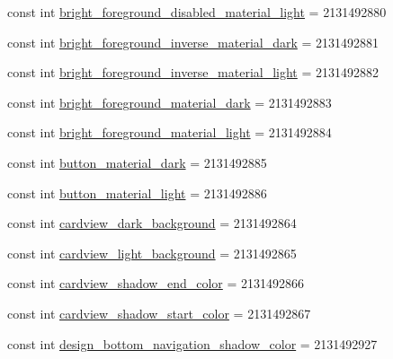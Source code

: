 \begin{DoxyCompactItemize}
const int \mbox{\hyperlink{class_f_w_p_s___app_1_1_droid_1_1_resource_1_1_color_aece9a2b0fe298f755847e43b8aae1e44}{bright\+\_\+foreground\+\_\+disabled\+\_\+material\+\_\+light}} = 2131492880
\item 
const int \mbox{\hyperlink{class_f_w_p_s___app_1_1_droid_1_1_resource_1_1_color_afa36b290d5382c4b94510a599b590055}{bright\+\_\+foreground\+\_\+inverse\+\_\+material\+\_\+dark}} = 2131492881
\item 
const int \mbox{\hyperlink{class_f_w_p_s___app_1_1_droid_1_1_resource_1_1_color_a1a5cf7a02bcf391cf2f2a0d705d61934}{bright\+\_\+foreground\+\_\+inverse\+\_\+material\+\_\+light}} = 2131492882
\item 
const int \mbox{\hyperlink{class_f_w_p_s___app_1_1_droid_1_1_resource_1_1_color_a499b6d22a3e6205b5ed151aaf6f10c6a}{bright\+\_\+foreground\+\_\+material\+\_\+dark}} = 2131492883
\item 
const int \mbox{\hyperlink{class_f_w_p_s___app_1_1_droid_1_1_resource_1_1_color_a9bea0472604f703ac8806c6e0479299a}{bright\+\_\+foreground\+\_\+material\+\_\+light}} = 2131492884
\item 
const int \mbox{\hyperlink{class_f_w_p_s___app_1_1_droid_1_1_resource_1_1_color_a103b7f43377e0103473a9e46514ba669}{button\+\_\+material\+\_\+dark}} = 2131492885
\item 
const int \mbox{\hyperlink{class_f_w_p_s___app_1_1_droid_1_1_resource_1_1_color_ab5d03e4a021259a2a97823e06f65083d}{button\+\_\+material\+\_\+light}} = 2131492886
\item 
const int \mbox{\hyperlink{class_f_w_p_s___app_1_1_droid_1_1_resource_1_1_color_ac1e1f64fb5fd6d979d99b37d349fdb81}{cardview\+\_\+dark\+\_\+background}} = 2131492864
\item 
const int \mbox{\hyperlink{class_f_w_p_s___app_1_1_droid_1_1_resource_1_1_color_a5cd7bd4b38ab7e1ae22bd16f92fd7d5a}{cardview\+\_\+light\+\_\+background}} = 2131492865
\item 
const int \mbox{\hyperlink{class_f_w_p_s___app_1_1_droid_1_1_resource_1_1_color_a9ec1fa7ba5bdcd5fedff123cda6ca3a6}{cardview\+\_\+shadow\+\_\+end\+\_\+color}} = 2131492866
\item 
const int \mbox{\hyperlink{class_f_w_p_s___app_1_1_droid_1_1_resource_1_1_color_a2118a6af7d0d96bcf0b8fe76909da830}{cardview\+\_\+shadow\+\_\+start\+\_\+color}} = 2131492867
\item 
const int \mbox{\hyperlink{class_f_w_p_s___app_1_1_droid_1_1_resource_1_1_color_a4765c3524afd9c89824483a6492b1e4e}{design\+\_\+bottom\+\_\+navigation\+\_\+shadow\+\_\+color}} = 2131492927

\end{DoxyCompactItemize}
